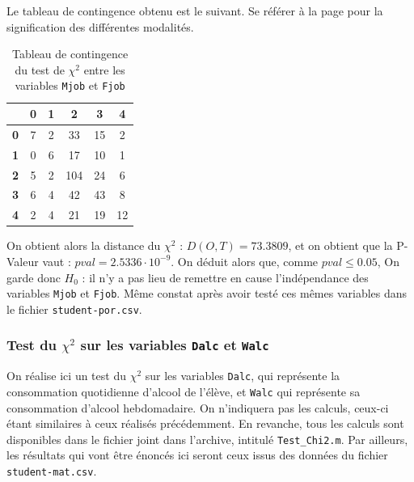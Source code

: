 \documentclass[11pt]{article}
\begin{document}
Le tableau de contingence obtenu est le suivant. Se référer à la page \pageref{rap2} pour la signification des différentes modalités.
\begin{table}[h] \centering \caption{Tableau de contingence du test de $\chi^2$ entre les variables \texttt{Mjob} et \texttt{Fjob}}
\begin{tabular}{|c|c|c|c|c|c|}
  \hline
 	\backslashbox{\textbf{\emph{Mjob}}}{\textbf{\emph{Fjob}}}& \textbf{0} &\textbf{1} & \textbf{2} & \textbf{3} & \textbf{4} \\
  \hline
          
            \textbf{0}&       7 &    2  &  33   & 15  &   2\\\hline
    \textbf{1}& 0     &6   & 17    &10     &1 \\\hline
    \textbf{2} &5 &    2  & 104  &  24 &    6\\\hline
     \textbf{3}& 6  &    4   & 42  &  43  &   8\\\hline
     \textbf{4}& 2 &    4    &21 &   19   & 12\\\hline
 \end{tabular}
\end{table}

On obtient alors la distance du $\chi^2$ : $D(O,T)=73.3809$, et on obtient que la P-Valeur vaut : $pval = 2.5336\cdot 10^{-9}$. On déduit alors que, comme $pval\leq 0.05$, On garde donc $H_0$ : il n'y a pas lieu de remettre en cause l'indépendance des variables \texttt{Mjob} et \texttt{Fjob}. Même constat après avoir testé ces mêmes variables dans le fichier \texttt{student-por.csv}.

%
\subsubsection{Test du $\chi^2$ sur les variables \texttt{Dalc} et \texttt{Walc}}
On réalise ici un test du $\chi^2$ sur les variables \texttt{Dalc}, qui représente la consommation quotidienne d'alcool de l'élève, et \texttt{Walc} qui représente sa consommation d'alcool hebdomadaire. On n'indiquera pas les calculs, ceux-ci étant similaires à ceux réalisés précédemment. En revanche, tous les calculs sont disponibles dans le fichier joint dans l'archive, intitulé \texttt{Test\_Chi2.m}. Par ailleurs, les résultats qui vont être énoncés ici seront ceux issus des données du fichier \texttt{student-mat.csv}. 
\end{document}
